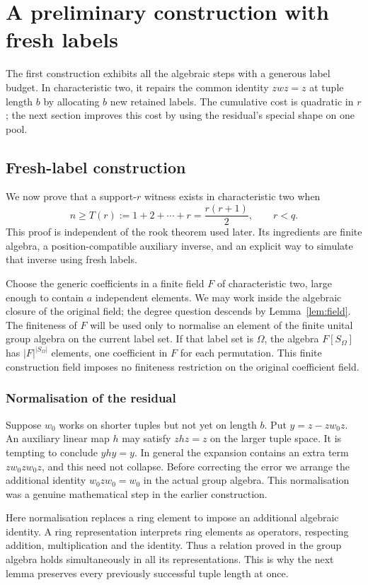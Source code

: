 \section{A preliminary construction with fresh labels}\label{sec:quadratic-route}
The first construction exhibits all the algebraic steps with a
generous label budget. In characteristic two, it repairs the common
identity $zwz=z$ at tuple length $b$ by allocating $b$ new retained
labels. The cumulative cost is quadratic in $r$; the next section
improves this cost by using the residual's special shape on one pool.

\subsection{Fresh-label construction}\label{sec:quadratic}
We now prove that a support-$r$ witness exists in characteristic two when
\[n\ge T(r):=1+2+\cdots+r=\frac{r(r+1)}2,\qquad r<q.\]
This proof is independent of the rook theorem used later. Its ingredients are finite algebra, a position-compatible auxiliary inverse, and an explicit way to simulate that inverse using fresh labels.

Choose the generic coefficients in a finite field $F$ of characteristic two, large enough to contain $a$ independent elements. We may work inside the algebraic closure of the original field; the degree question descends by Lemma~\ref{lem:field}. The finiteness of $F$ will be used only to normalise an element of the finite unital group algebra on the current label set.
If that label set is $\Omega$, the algebra $F[S_\Omega]$ has
$|F|^{|S_\Omega|}$ elements, one coefficient in $F$ for each
permutation. This finite construction field imposes no finiteness
restriction on the original coefficient field.

\subsubsection{Normalisation of the residual}
Suppose $w_0$ works on shorter tuples but not yet on length $b$. Put $y=z-zw_0z$. An auxiliary linear map $h$ may satisfy $zhz=z$ on the larger tuple space. It is tempting to conclude $yhy=y$. In general the expansion contains an extra term $zw_0zw_0z$, and this need not collapse. Before correcting the error we arrange the additional identity $w_0zw_0=w_0$ in the actual group algebra. This normalisation was a genuine mathematical step in the earlier construction.

Here normalisation replaces a ring element to impose an additional
algebraic identity. A ring representation interprets ring elements as operators,
respecting addition, multiplication and the identity. Thus a relation
proved in the group algebra holds simultaneously in all its
representations. This is why the next lemma preserves every previously
successful tuple length at once.

